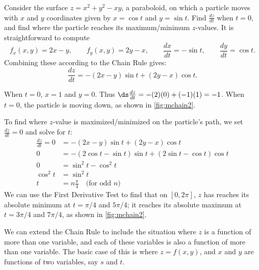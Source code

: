\begin{example}\label{ex_mchain2}
Consider the surface $z=x^2+y^2-xy$, a paraboloid, on which a particle moves with $x$ and $y$ coordinates given by $x=\cos t$ and $y=\sin t$. Find $\frac{dz}{dt}$ when $t=0$, and find where the particle reaches its maximum/minimum $z$-values.
\solution
It is straightforward to compute
\[f_x(x,y) = 2x-y,\qquad f_y(x,y) = 2y-x,\qquad \frac{dx}{dt} = -\sin t,\qquad \frac{dy}{dt} = \cos t.\]
Combining these according to the Chain Rule gives:
\[\frac{dz}{dt} = -(2x-y)\sin t + (2y-x)\cos t.\]

When $t=0$, $x=1$ and $y=0$. Thus $\ds\frac{dz}{dt} = -(2)(0)+ (-1)(1) = -1$. When $t=0$, the particle is moving down, as shown in \autoref{fig:mchain2}. 


To find where $z$-value is maximized/minimized on the particle's path, we set $\frac{dz}{dt}=0$ and solve for $t$:
\begin{align*}
\frac{dz}{dt} =0
	&= -(2x-y)\sin t + (2y-x)\cos t\\
	0&= -(2\cos t-\sin t)\sin t+(2\sin t-\cos t)\cos t\\
	0&= \sin^2t-\cos^2t\\
\cos^2t &=\sin^2t\\
	t&= n\frac{\pi}4\quad \text{(for odd $n$)}
\end{align*}
We can use the First Derivative Test to find that on $[0,2\pi]$, $z$ has reaches its absolute minimum at $t=\pi/4$ and $5\pi/4$; it reaches its absolute maximum at $t=3\pi/4$ and $7\pi/4$, as shown in \autoref{fig:mchain2}.
\end{example}


We can extend the Chain Rule to include the situation where $z$ is a function of more than one variable, and each of these variables is also a function of more than one variable. The basic case of this is where $z=f(x,y)$, and $x$ and $y$ are functions of two variables, say $s$ and $t$.

